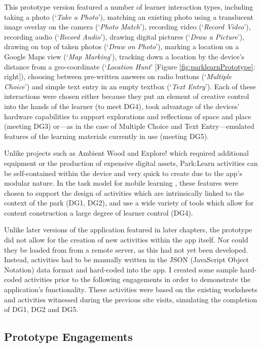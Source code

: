 This prototype version featured a number of learner interaction types, including taking a photo (`\textit{Take a Photo}'), matching an existing photo using a translucent image overlay on the camera (`\textit{Photo Match}'), recording video (`\textit{Record Video}'), recording audio (`\textit{Record Audio}'), drawing digital pictures (`\textit{Draw a Picture}'), drawing on top of taken photos (`\textit{Draw on Photo}'), marking a location on a Google Maps view (`\textit{Map Marking}'), tracking down a location by the device’s distance from a geo-coordinate (`\textit{Location Hunt}' [Figure \ref{fig:parklearnPrototype}: right]), choosing between pre-written answers on radio buttons (`\textit{Multiple Choice}') and simple text entry in an empty textbox (`\textit{Text Entry}'). Each of these interactions were chosen either because they put an element of creative control into the hands of the learner (to meet DG4), took advantage of the devices’ hardware capabilities to support explorations and reflections of space and place (meeting DG3) or---as in the case of Multiple Choice and Text Entry---emulated features of the learning materials currently in use (meeting DG5). 

Unlike projects such as Ambient Wood \citep{Rogers2004} and Explore! \citep{Costabile2008} which required additional equipment or the production of expensive digital assets, Park:Learn activities can be self-contained within the device and very quick to create due to the app’s modular nature. In the task model for mobile learning \citep{Sharples2013}, these features were chosen to support the design of activities which are intrinsically linked to the context of the park (DG1, DG2), and use a wide variety of tools which allow for content construction a large degree of learner control (DG4).

Unlike later versions of the application featured in later chapters, the prototype did not allow for the creation of new activities within the app itself. Nor could they be loaded from from a remote server, as this had not yet been developed. Instead, activities had to be manually written in the JSON (JavaScript Object Notation) data format and hard-coded into the app. I created some sample hard-coded activities prior to the following engagements in order to demonstrate the application's functionality. These activities were based on the existing worksheets and activities witnessed during the previous site visits, simulating the completion of DG1, DG2 and DG5.

\subsection{Prototype Engagements}


